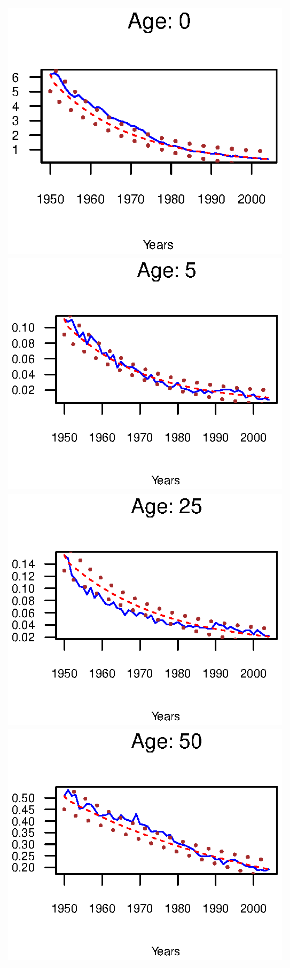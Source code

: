 \documentclass[smallextended]{svjour3}
\begin{document}
\begin{figure}[htb]
    \includegraphics[width = 2.85in]{PlotWomen0.eps}
    \includegraphics[width = 2.85in]{PlotWomen5.eps}
    \includegraphics[width = 2.85in]{PlotWomen25.eps}
    \includegraphics[width = 2.85in]{PlotWomen50.eps}

\end{figure}
\end{document}
